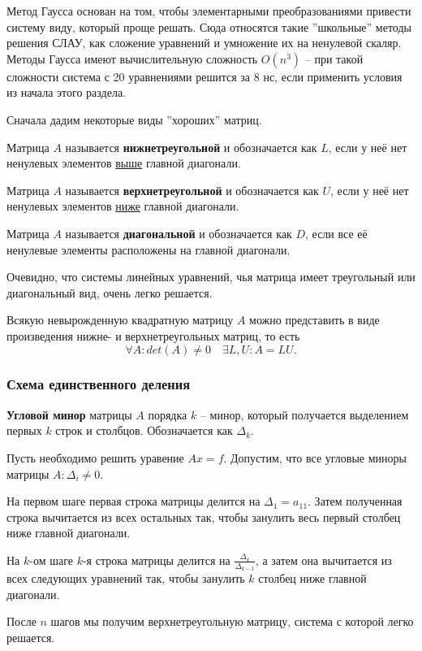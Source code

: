 \documentclass{article}
\begin{document}
Метод Гаусса основан на том, чтобы элементарными преобразованиями привести
систему виду, который проще решать. Сюда относятся такие ''школьные'' методы
решения СЛАУ, как сложение уравнений и умножение их на ненулевой скаляр. Методы
Гаусса имеют вычислительную сложность $O(n^3)$ -- при такой сложности система
с 20 уравнениями решится за 8 нс, если применить условия из начала этого
раздела.

Сначала дадим некоторые виды ''хороших'' матриц.

\begin{define}
	Матрица $A$ называется \textbf{нижнетреугольной} и обозначается как $L$,
	если у неё нет ненулевых элементов \underline{выше} главной диагонали.
\end{define}

\begin{define}
	Матрица $A$ называется \textbf{верхнетреугольной} и обозначается как
	$U$, если у неё нет ненулевых элементов \underline{ниже} главной
	диагонали.
\end{define}

\begin{define}
	Матрица $A$ называется \textbf{диагональной} и обозначается как $D$,
	если все её ненулевые элементы расположены на главной диагонали.
\end{define}

Очевидно, что системы линейных уравнений, чья матрица имеет треугольный
или диагональный вид, очень легко решается.

\newpage

\begin{theorem}[об LU-разложении]
	Всякую невырожденную квадратную матрицу $A$ можно представить в виде
	произведения нижне- и верхнетреугольных матриц, то есть
	\[\forall A: det(A)\ne 0\quad\exists L,U: A=LU.\]
\end{theorem}

\subsubsection{Схема единственного деления}
\begin{define}
	\textbf{Угловой минор} матрицы $A$ порядка $k$ -- минор, который
	получается выделением первых $k$ строк и столбцов. Обозначается
	как $\Delta_k$.
\end{define}

\begin{algorithm}
\label{eq:gauss_single_division}
	Пусть необходимо решить уравение $Ax=f$. Допустим, что все угловые
	миноры матрицы $A:\Delta_i\ne 0$.

	На первом шаге первая строка матрицы делится на $\Delta_1=a_{11}$.
	Затем полученная строка вычитается из всех остальных так, чтобы занулить
	весь первый столбец ниже главной диагонали.

	На $k$-ом шаге $k$-я строка матрицы делится на
	$\frac{\Delta_k}{\Delta_{k-1}}$, а затем она вычитается из всех
	следующих уравнений так, чтобы занулить $k$ столбец ниже главной
	диагонали.

	После $n$ шагов мы получим верхнетреугольную матрицу, система с которой
	легко решается.
\end{algorithm}
\end{document}
